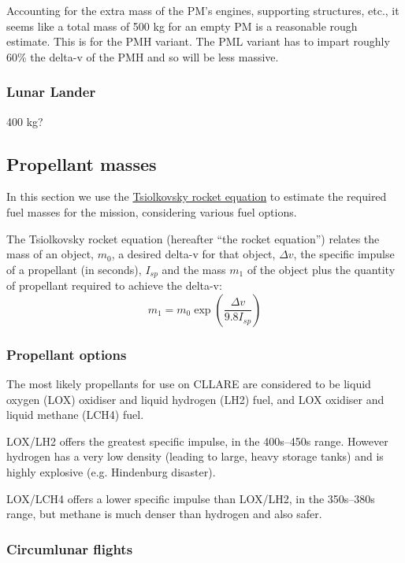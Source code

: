 \documentclass{report}
\begin{document}
Accounting for the extra mass of the PM's engines, supporting structures, etc., it seems like a total mass of 500 kg for an empty PM is a reasonable rough estimate.  This is for the PMH variant.  The PML variant has to impart roughly 60\% the delta-v of the PMH and so will be less massive.

\subsubsection{Lunar Lander}

400 kg?

\subsection{Propellant masses} \label{sec:rocket_eq}

In this section we use the \href{http://en.wikipedia.org/wiki/Tsiolkovsky_rocket_equation}{Tsiolkovsky rocket equation} to estimate the required fuel masses for the mission, considering various fuel options.

The Tsiolkovsky rocket equation (hereafter ``the rocket equation'') relates the mass of an object, $m_0$, a desired delta-v for that object, $\Delta v$, the specific impulse of a propellant (in seconds), $I_{sp}$ and the mass $m_1$ of the object plus the quantity of propellant required to achieve the delta-v:
\begin{equation}
m_1 = m_0\exp \left( \frac{\Delta v}{9.8 I_{sp}} \right)
\end{equation}

\subsubsection{Propellant options}

The most likely propellants for use on CLLARE are considered to be liquid oxygen (LOX) oxidiser and liquid hydrogen (LH2) fuel, and LOX oxidiser and liquid methane (LCH4) fuel.

LOX/LH2 offers the greatest specific impulse, in the 400s--450s range.  However hydrogen has a very low density (leading to large, heavy storage tanks) and is highly explosive (e.g. Hindenburg disaster).

LOX/LCH4 offers a lower specific impulse than LOX/LH2, in the 350s--380s range, but methane is much denser than hydrogen and also safer.

\subsubsection{Circumlunar flights}
\end{document}
